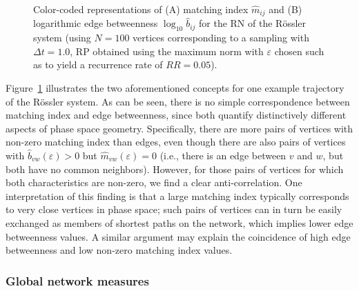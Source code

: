 \documentclass[graybox]{svmult}
\begin{document}
\begin{figure}
\centering
{} 
\caption{Color-coded representations of (A) matching index $\hat{m}_{ij}$ and (B) logarithmic edge betweenness $\log_{10} \hat{b}_{ij}$ for the RN of the R\"ossler system (using $N=100$ vertices corresponding to a sampling with $\Delta t=1.0$, RP obtained using the maximum norm with $\varepsilon$ chosen such as to yield a recurrence rate of $RR=0.05$).}
\label{fig:edgemeasures}
\end{figure}

Figure~\ref{fig:edgemeasures} illustrates the two aforementioned concepts for one example trajectory of the R\"ossler system. As can be seen, there is no simple correspondence between matching index and edge betweenness, since both quantify distinctively different aspects of phase space geometry. Specifically, there are more pairs of vertices with non-zero matching index than edges, even though there are also pairs of vertices with $\hat{b}_{vw}(\varepsilon)>0$ but $\hat{m}_{vw}(\varepsilon)=0$ (i.e., there is an edge between $v$ and $w$, but both have no common neighbors). However, for those pairs of vertices for which both characteristics are non-zero, we find a clear anti-correlation. One interpretation of this finding is that a large matching index typically corresponds to very close vertices in phase space; such pairs of vertices can in turn be easily exchanged as members of shortest paths on the network, which implies lower edge betweenness values. A similar argument may explain the coincidence of high edge betweenness and low non-zero matching index values.


\subsubsection{Global network measures}
\end{document}
